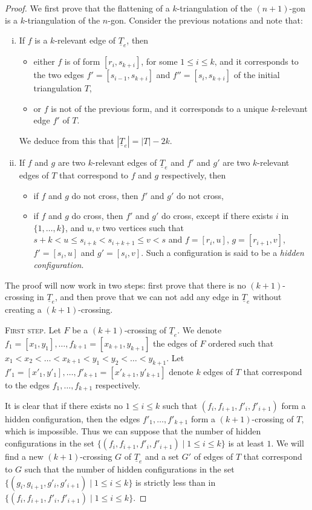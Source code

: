 \documentclass[12pt]{amsart}
\begin{document}
\begin{proof} We first prove that the flattening of a $k$-triangulation of the $(n+1)$-gon is a $k$-triangulation of the $n$-gon. Consider the previous notations and note that:
\begin{enumerate}[(i)]
\item If $f$ is a $k$-relevant edge of $\underline{T}_e$, then
\begin{itemize}
\item either $f$ is of form $[r_i,s_{k+i}]$, for some $1\le i\le k$, and it corresponds to the two edges $f'=[s_{i-1},s_{k+i}]$ and $f''=[s_i,s_{k+i}]$ of the initial triangulation $T$,
\item or $f$ is not of the previous form, and it corresponds to a unique $k$-relevant edge $f'$ of $T$.
\end{itemize}
We deduce from this that $|\underline{T}_e|=|T|-2k$.

\item If $f$ and $g$ are two $k$-relevant edges of $\underline{T}_e$ and $f'$ and $g'$ are two $k$-relevant edges of $T$ that correspond to $f$ and $g$ respectively, then
\begin{itemize}
\item if $f$ and $g$ do not cross, then $f'$ and $g'$ do not cross,
\item if $f$ and $g$ do cross, then $f'$ and $g'$ do cross, except if there exists $i$ in $\{1,\ldots,k\}$, and $u,v$ two vertices such that $s+k<u\le s_{i+k}<s_{i+k+1}\le v<s$ and $f=[r_i,u]$, $g=[r_{i+1},v]$, $f'=[s_i,u]$ and $g'=[s_i,v]$. Such a configuration is said to be a \emph{hidden configuration}.
\end{itemize}

\end{enumerate}

The proof will now work in two steps: first prove that there is no $(k+1)$-crossing in $\underline{T}_e$, and then prove that we can not add any edge in $\underline{T}_e$ without creating a $(k+1)$-crossing.

\medskip
\noindent\textsc{First step.}
Let $F$ be a $(k+1)$-crossing of $\underline{T}_e$. We denote $f_1=[x_1,y_1],\ldots,f_{k+1}=[x_{k+1},y_{k+1}]$ the edges of $F$ ordered such that $x_1<x_2<\ldots<x_{k+1}<y_1<y_2<\ldots<y_{k+1}$. Let $f'_1=[x'_1,y'_1],\ldots,f'_{k+1}=[x'_{k+1},y'_{k+1}]$ denote $k$ edges of $T$ that correspond to the edges $f_1,\ldots,f_{k+1}$ respectively.

It is clear that if there exists no $1\le i\le k$ such that $(f_i,f_{i+1},f'_i,f'_{i+1})$ form a hidden configuration, then the edges $f'_1,\ldots,f'_{k+1}$ form a $(k+1)$-crossing of $T$, which is impossible. Thus we can suppose that the number of hidden configurations in the set $\{(f_i,f_{i+1},f'_i,f'_{i+1})\;|\; 1\le i\le k\}$ is at least $1$. We will find a new $(k+1)$-crossing $G$ of $\underline{T}_e$ and a set $G'$ of edges of $T$ that correspond to $G$ such that the number of hidden configurations in the set $\{(g_i,g_{i+1},g'_i,g'_{i+1})\;|\; 1\le i\le k\}$ is strictly less than in $\{(f_i,f_{i+1},f'_i,f'_{i+1})\;|\; 1\le i\le k\}$.


\end{proof}
\end{document}
